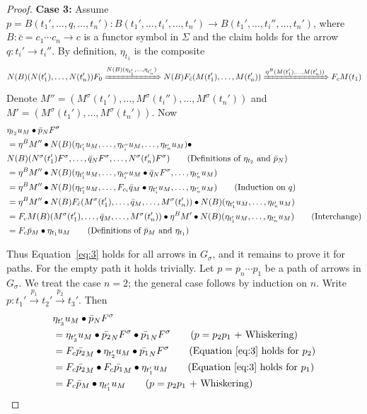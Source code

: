 \begin{proof}
  \noindent \textbf{Case 3:} Assume $p = B(t_1',\ldots, q,\ldots, t_n')\colon B(t_1',\ldots, t_i',\ldots, t_n')\to B(t_1',\ldots, t_i'',\ldots, t_n')$, where $B\colon \bar{c} = c_1\cdots c_n\to c$ is a functor symbol in $\Sigma$ and the claim holds for the arrow $q\colon t_i'\to t_i''$. By definition, $\eta_{t_1}$ is the composite
  {\small\[
  N(B)(N(t_1'),\ldots, N(t_n'))F_0\xRightarrow{N(B)(\eta_{t_1'},\ldots, \eta_{t_n'})} N(B)F_{\bar{c}}(M(t_1'),\ldots, M(t_n'))\xRightarrow{\eta^B(M(t_1'),\ldots, M(t_n'))} F_cM(t_1)
  \]}
  Denote $M'' = (M^\sigma(t_1'),\ldots, M^\sigma(t_i''),\ldots,  M^\sigma(t_n'))$ and $M' = (M^\sigma(t_1'),\ldots, M^\sigma(t_n'))$. Now
  {\small\noindent
  \begin{align*}
       &\eta_{t_2}u_M\bullet \bar{p}_NF^\sigma\\
       &= \eta^B M''\bullet N(B)(\eta_{t_1'}u_M,\ldots,\eta_{t_i''}u_M,\ldots, \eta_{t_n'}u_M)\bullet\\
       & N(B)(N^\sigma(t_1')F^\sigma,\ldots,\bar{q}_N F^\sigma,\ldots, N^\sigma(t_n')F^\sigma) \tag{Definitions of $\eta_{t_2}$ and $\bar{p}_N$}\\
       &=  \eta^BM''\bullet N(B)(\eta_{t_1'}u_M, \ldots, \eta_{t_i''}u_M\bullet\bar{q}_NF^\sigma, \ldots, \eta_{t_n'}u_M)\\
       &= \eta^B M''\bullet N(B)(\eta_{t_1'}u_M,\ldots, F_{c_i}\bar{q}_M\bullet \eta_{t_i'}u_M,\ldots, \eta_{t_n'}u_M)\tag{Induction on $q$}\\
       &= \eta^B M''\bullet N(B)F_{\bar{c}}(M^\sigma(t_1'),\ldots,\bar{q}_M,\ldots, M^\sigma(t_n'))\bullet N(B)(\eta_{t_1'}u_M,\ldots, \eta_{t_n'}u_M)\\
       &= F_cM(B)(M^\sigma(t_1'),\ldots, \bar{q}_M,\ldots, M^\sigma(t_n'))\bullet \eta^B M'\bullet
       N(B)(\eta_{t_1'}u_M,\ldots, \eta_{t_n'}u_M)\tag{Interchange}\\
       &= F_c\bar{p}_M\bullet \eta_{t_1}u_M \tag{Definitions of $\bar{p}_M$ and $\eta_{t_1}$}
  \end{align*}
  }

  Thus Equation~\eqref{eq:3} holds for all arrows in $G_\sigma$, and it remains to prove it for paths. For the empty path it holds trivially. Let $p = p_n\cdots p_1$ be a path of arrows in $G_\sigma$. We treat the case $n = 2$; the general case follows by induction on $n$. Write $p\colon t_1'\xrightarrow{p_1}t_2'\xrightarrow{p_2}t_3'$. Then
  \begin{align*}
       &\eta_{t_3'}u_M\bullet \bar{p}_NF^\sigma\\
       &= \eta_{t_3'}u_M\bullet \bar{p_2}_NF^\sigma \bullet \bar{p_1}_NF^\sigma \tag{$p = p_2p_1$ + Whiskering}\\
       &= F_c\bar{p_2}_M\bullet \eta_{t_2'}u_M\bullet \bar{p_1}_NF^\sigma \tag{Equation~\eqref{eq:3} holds for $p_2$}\\
       &= F_c\bar{p_2}_M\bullet F_c\bar{p_1}_M\bullet \eta_{t_1'}u_M \tag{Equation~\eqref{eq:3} holds for $p_1$}\\
       &= F_c\bar{p}_M\bullet \eta_{t_1'}u_M \tag{$p = p_2p_1$ + Whiskering}
  \end{align*}\qedhere

\end{proof}
